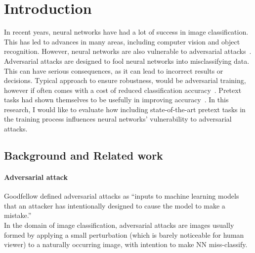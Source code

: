 \section{Introduction}

In recent years, neural networks have had a lot of success in image classification.
This has led to advances in many areas, including computer vision and object recognition.
However, neural networks are also vulnerable to adversarial attacks~\cite{ilyas2019adversarial}.
Adversarial attacks are designed to fool neural networks into misclassifying data.
This can have serious consequences, as it can lead to incorrect results or decisions.
Typical approach to ensure robustness, would be adversarial training, however if often comes with a cost of
reduced classification accuracy~\cite{https://doi.org/10.48550/arxiv.1805.12152}.
Pretext tasks had shown themselves to be usefully in improving accuracy~\cite{kolesnikov2019revisiting}.
In this research, I would like to evaluate how including state-of-the-art pretext tasks in the training process
influences neural networks' vulnerability to adversarial attacks.

\subsection{Background and Related work}

\paragraph{Adversarial attack}
Goodfellow defined adversarial attacks as “inputs to machine learning models that an
attacker has intentionally designed to cause the model to make a mistake.” ~\cite{DBLP:journals/corr/abs-1802-08195} \\
In the domain of image classification, adversarial attacks are images usually formed by applying a small perturbation
(which is barely noticeable for human viewer) to a naturally occurring image, with intention to make NN miss-classify.

